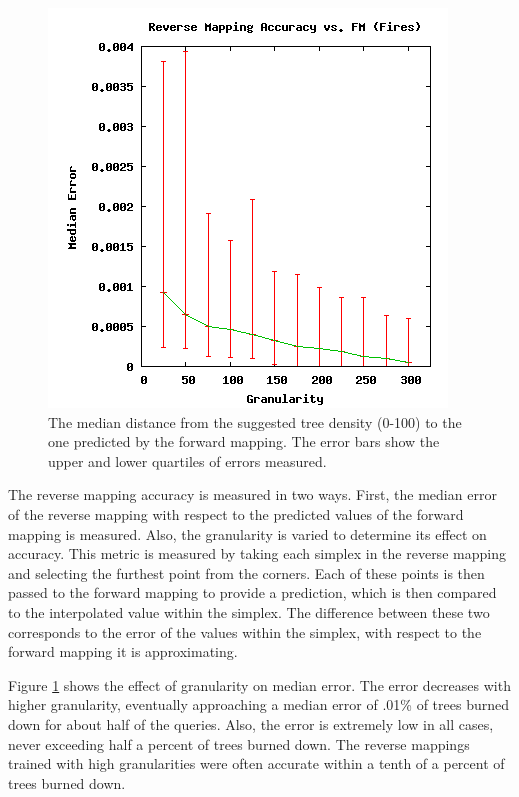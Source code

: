 \begin{figure}[ht]
\centering
\includegraphics[scale=.5]{images/results_fires/rmaccfm.png}
\caption{The median distance from the suggested tree density (0-100) to the one predicted by the forward mapping.
The error bars show the upper and lower quartiles of errors measured.}
\label{fig:rmaccfm}
\end{figure}

The reverse mapping accuracy is measured in two ways.
First, the median error of the reverse mapping with respect to the predicted values of the forward mapping is measured.
Also, the granularity is varied to determine its effect on accuracy.
This metric is measured by taking each simplex in the reverse mapping and selecting the furthest point from the corners.
Each of these points is then passed to the forward mapping to provide a prediction, which is then compared to the interpolated value within the simplex.
The difference between these two corresponds to the error of the values within the simplex, with respect to the forward mapping it is approximating. 

Figure \ref{fig:rmaccfm} shows the effect of granularity on median error.
The error decreases with higher granularity, eventually approaching a median error of .01\% of trees burned down for about half of the queries.
Also, the error is extremely low in all cases, never exceeding half a percent of trees burned down.
The reverse mappings trained with high granularities were often accurate within a tenth of a percent of trees burned down.

